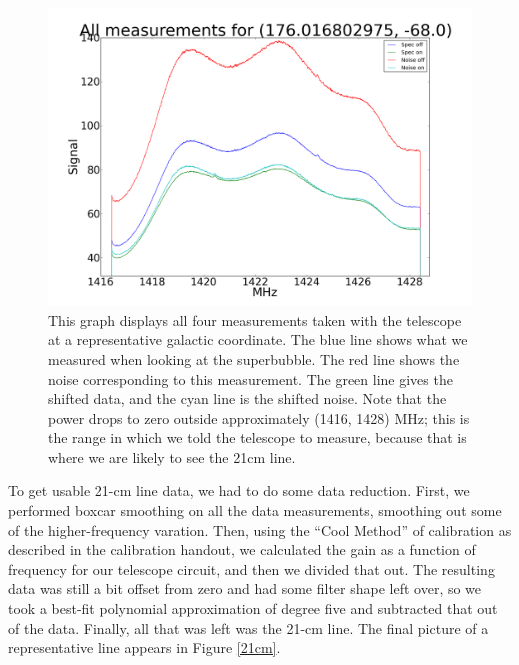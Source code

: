 \documentclass[11pt]{article}
\begin{document}
\begin{figure}
\centering
\includegraphics[scale=0.35]{garphs/all}
\caption{This graph displays all four measurements taken with the telescope at a representative galactic coordinate. The blue line shows what we measured when looking at the superbubble. The red line shows the noise corresponding to this measurement. The green line gives the shifted data, and the cyan line is the shifted noise. Note that the power drops to zero outside approximately (1416, 1428) MHz; this is the range in which we told the telescope to measure, because that is where we are likely to see the 21cm line. \label{spectra}}
\end{figure} 

To get usable 21-cm line data, we had to do some data reduction. First, we performed boxcar smoothing on all the data measurements, smoothing out some of the higher-frequency varation. Then, using the ``Cool Method'' of calibration as described in the calibration handout, we calculated the gain as a function of frequency for our telescope circuit, and then we divided that out. The resulting data was still a bit offset from zero and had some filter shape left over, so we took a best-fit polynomial approximation of degree five and subtracted that out of the data. Finally, all that was left was the 21-cm line. The final picture of a representative line appears in Figure \ref{21cm}.
\end{document}
